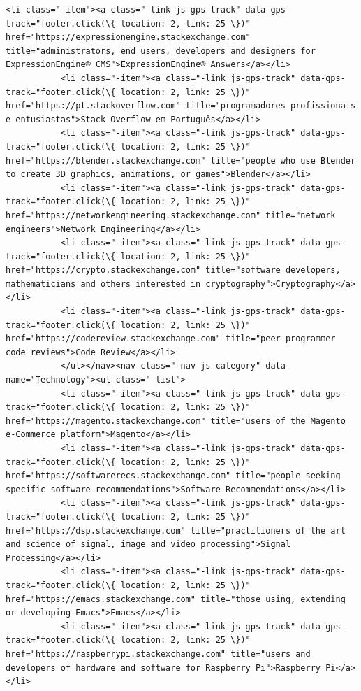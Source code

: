 \documentclass[11pt]{article}
\begin{document}
\begin{Verbatim}[commandchars=\\\{\}]
           <li class="-item"><a class="-link js-gps-track" data-gps-track="footer.click(\{ location: 2, link: 25 \})" href="https://expressionengine.stackexchange.com" title="administrators, end users, developers and designers for ExpressionEngine® CMS">ExpressionEngine® Answers</a></li>
           <li class="-item"><a class="-link js-gps-track" data-gps-track="footer.click(\{ location: 2, link: 25 \})" href="https://pt.stackoverflow.com" title="programadores profissionais e entusiastas">Stack Overflow em Português</a></li>
           <li class="-item"><a class="-link js-gps-track" data-gps-track="footer.click(\{ location: 2, link: 25 \})" href="https://blender.stackexchange.com" title="people who use Blender to create 3D graphics, animations, or games">Blender</a></li>
           <li class="-item"><a class="-link js-gps-track" data-gps-track="footer.click(\{ location: 2, link: 25 \})" href="https://networkengineering.stackexchange.com" title="network engineers">Network Engineering</a></li>
           <li class="-item"><a class="-link js-gps-track" data-gps-track="footer.click(\{ location: 2, link: 25 \})" href="https://crypto.stackexchange.com" title="software developers, mathematicians and others interested in cryptography">Cryptography</a></li>
           <li class="-item"><a class="-link js-gps-track" data-gps-track="footer.click(\{ location: 2, link: 25 \})" href="https://codereview.stackexchange.com" title="peer programmer code reviews">Code Review</a></li>
           </ul></nav><nav class="-nav js-category" data-name="Technology"><ul class="-list">
           <li class="-item"><a class="-link js-gps-track" data-gps-track="footer.click(\{ location: 2, link: 25 \})" href="https://magento.stackexchange.com" title="users of the Magento e-Commerce platform">Magento</a></li>
           <li class="-item"><a class="-link js-gps-track" data-gps-track="footer.click(\{ location: 2, link: 25 \})" href="https://softwarerecs.stackexchange.com" title="people seeking specific software recommendations">Software Recommendations</a></li>
           <li class="-item"><a class="-link js-gps-track" data-gps-track="footer.click(\{ location: 2, link: 25 \})" href="https://dsp.stackexchange.com" title="practitioners of the art and science of signal, image and video processing">Signal Processing</a></li>
           <li class="-item"><a class="-link js-gps-track" data-gps-track="footer.click(\{ location: 2, link: 25 \})" href="https://emacs.stackexchange.com" title="those using, extending or developing Emacs">Emacs</a></li>
           <li class="-item"><a class="-link js-gps-track" data-gps-track="footer.click(\{ location: 2, link: 25 \})" href="https://raspberrypi.stackexchange.com" title="users and developers of hardware and software for Raspberry Pi">Raspberry Pi</a></li>

\end{Verbatim}
\end{document}
